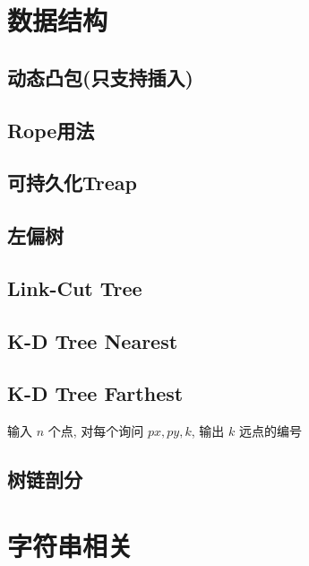 \documentclass[landscape, twocolumn, 8pt, a4paper, twoside]{extarticle}
\begin{document}
\section{数据结构}
  \subsection{动态凸包(只支持插入)}
    
    
  \subsection{Rope用法}
    
  
  \subsection{可持久化Treap}
    
  
  \subsection{左偏树}
    
  
  \subsection{Link-Cut Tree}
    

  \subsection{K-D Tree Nearest}
    

  \subsection{K-D Tree Farthest}
    输入 $n$ 个点, 对每个询问 $px, py, k$, 输出 $k$ 远点的编号
    

  \subsection{树链剖分}
    

\section{字符串相关}
\end{document}
